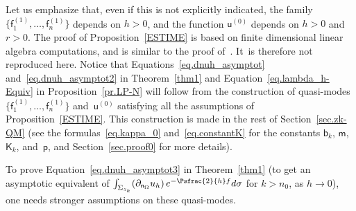 Let us emphasize that, even if this is not explicitly indicated, the
family $\{\mathsf f_1^{(1)}, \ldots,
\mathsf f_n^{(1)}\} $ depends on $h>0$, and the function $\mathsf u^{(0)}$ depends on $h>0$ and
$r>0$. The proof of Proposition~\ref{ESTIME} is based on finite dimensional
linear algebra computations, and is similar to the proof
of~\cite[Th.\,5]{DLLN-saddle1}. It~is
therefore not reproduced here. Notice that
Equations~\eqref{eq.dnuh_asymptot} and~\eqref{eq.dnuh_asymptot2} in
Theorem~\ref{thm1} and Equation~\eqref{eq.lambda_h-Equiv} in
Proposition~\ref{pr.LP-N} will follow from the construction of
quasi-modes $\{\mathsf f_1^{(1)}, \ldots, \mathsf f_n^{(1)}\} $ and~$\mathsf u^{(0)}$ satisfying all the assumptions of
Proposition~\ref{ESTIME}. This construction is made in the rest of Section~\ref{sec.zk-QM} (see
the formulas~\eqref{eq.kappa_0} and~\eqref{eq.constantK} for the
constants $\mathsf b_k$, $\mathsf m$, $\mathsf K_k$, and~$\mathsf
p$, and Section~\ref{sec.proof0} for more details).

To prove Equation~\eqref{eq.dnuh_asymptot3} in Theorem~\ref{thm1} (\ie to get an asymptotic equivalent of $\int_{\Sigma_{z_k}} (\partial_{\mathsf n_\Omega} u_h)\, e^{-\Psfrac{2}{h}f} d\sigma$ for $k>n_0$, as $h\to 0$), one needs stronger assumptions on these quasi-modes.

